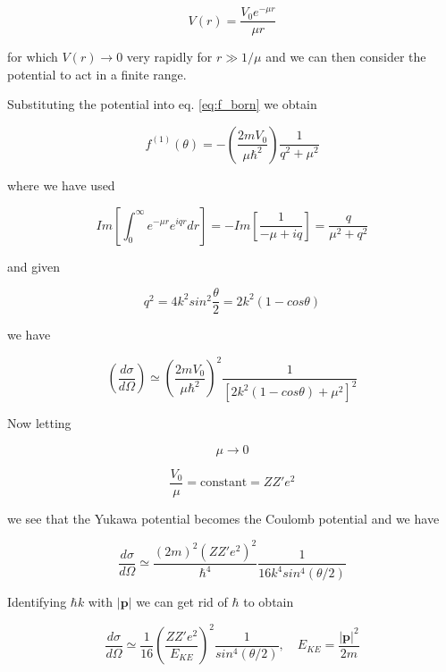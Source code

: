 \documentclass{article}
\begin{document}
\begin{equation}
V(r) = \frac{V_0 e^{-\mu r}}{\mu r}
\end{equation}

for which \( V(r) \to 0\) very rapidly for \( r \gg 1/\mu \) and we can then consider the potential to act in a finite range.

Substituting the potential into eq. \eqref{eq:f_born} we obtain

\begin{equation}
f^{(1)}(\theta) = -\left(\frac{2mV_0}{\mu \hbar^2}\right) \frac{1}{q^2+\mu^2}
\end{equation}

where we have used

\begin{equation}
Im \left[ \int_0^{\infty} e^{-\mu r} e^{iqr} dr \right] = - Im \left[\frac{1}{-\mu + iq} \right] = \frac{q}{\mu^2 + q^2}
\end{equation}

and given

\begin{equation}
q^2 = 4k^2sin^2\frac{\theta}{2} = 2k^2(1-cos\theta)
\end{equation}

we have

\begin{equation}
\left( \frac{d\sigma}{d\Omega} \right) \simeq \left( \frac{2mV_0}{\mu\hbar^2} \right)^2 \frac{1}{[2k^2(1-cos\theta) + \mu^2]^2}
\end{equation}

Now letting

\[
\mu \to 0
\]

\[
\frac{V_0}{\mu} = \text{constant} = ZZ'e^2
\]

we see that the Yukawa potential becomes the Coulomb potential and we have

\begin{equation}
\frac{d\sigma}{d\Omega} \simeq \frac{(2m)^2(ZZ'e^2)^2}{\hbar^4} \frac{1}{16k^4sin^4(\theta/2)}
\end{equation}

Identifying \( \hbar k \) with \(|\bm{p}|\) we can get rid of \(\hbar\) to obtain

\begin{equation}
\frac{d\sigma}{d\Omega} \simeq  \frac{1}{16} \left( \frac{ZZ'e^2}{E_{KE}} \right)^2 \frac{1}{sin^4(\theta/2)}, \quad E_{KE} = \frac{|\bm{p}|^2}{2m}
\end{equation}
\end{document}
